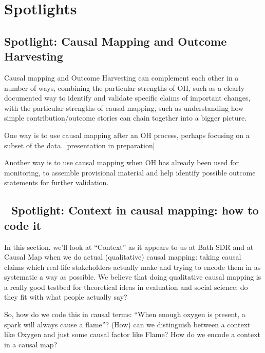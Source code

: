 \documentclass[
]{book}
\begin{document}
\hypertarget{part-spotlights}{%
\part{Spotlights}\label{part-spotlights}}

\hypertarget{spotlight-causal-mapping-and-outcome-harvesting}{%
\chapter{Spotlight: Causal Mapping and Outcome Harvesting}\label{spotlight-causal-mapping-and-outcome-harvesting}}

Causal mapping and Outcome Harvesting can complement each other in a number of ways, combining the particular strengths of OH, such as a clearly documented way to identify and validate specific claims of important changes, with the particular strengths of causal mapping, such as understanding how simple contribution/outcome stories can chain together into a bigger picture.

One way is to use causal mapping after an OH process, perhaps focusing on a subset of the data. {[}presentation in preparation{]}

Another way is to use causal mapping when OH has already been used for monitoring, to assemble provisional material and help identify possible outcome statements for further validation.

\hypertarget{spotlight-context-in-causal-mapping-how-to-code-it}{%
\chapter{🧠 Spotlight: Context in causal mapping: how to code it}\label{spotlight-context-in-causal-mapping-how-to-code-it}}

In this section, we'll look at ``Context'' as it appears to us at Bath SDR and at Causal Map when we do actual (qualitative) causal mapping: taking causal claims which real-life stakeholders actually make and trying to encode them in as systematic a way as possible. We believe that doing qualitative causal mapping is a really good testbed for theoretical ideas in evaluation and social science: do they fit with what people actually say?

So, how do we code this in causal terms: ``When enough oxygen is present, a spark will always cause a flame''? (How) can we distinguish between a context like Oxygen and just some causal factor like Flame? How do we encode a context in a causal map?
\end{document}
